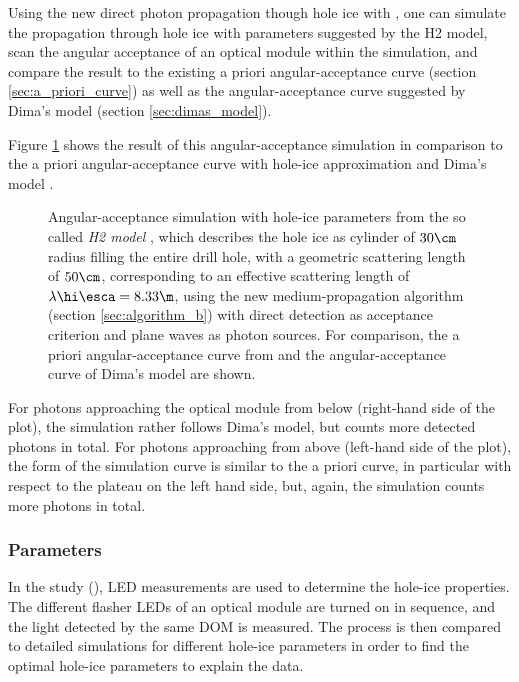Using the new direct photon propagation though hole ice with \clsim, one can simulate the propagation through hole ice with parameters suggested by the H2 model, scan the angular acceptance of an optical module within the simulation, and compare the result to the existing a priori angular-acceptance curve (section \ref{sec:a_priori_curve}) as well as the angular-acceptance curve suggested by Dima's model (section \ref{sec:dimas_model}).


Figure \ref{fig:xaeg2Mee} shows the result of this angular-acceptance simulation in comparison to the a priori angular-acceptance curve with hole-ice approximation \cite{icepaper} and Dima's model \cite{flasherdataderivedicemodels}.

\begin{figure}[htbp]
  \caption{Angular-acceptance simulation with hole-ice parameters from the so called \textit{H2 model} \cite{holeicestudieswithyag}, which describes the hole ice as cylinder of $30\cm$ radius filling the entire drill hole, with a geometric scattering length of $50\cm$, corresponding to an effective scattering length of $\lambda\hi\esca = 8.33\m$, using the new medium-propagation algorithm (section \ref{sec:algorithm_b}) with direct detection as acceptance criterion and plane waves as photon sources. For comparison, the a priori angular-acceptance curve from \cite{icepaper} and the angular-acceptance curve of Dima's model \cite{flasherdataderivedicemodels} are shown.}
  \label{fig:xaeg2Mee}
\end{figure}

For photons approaching the optical module from below (right-hand side of the plot), the simulation rather follows Dima's model, but counts more detected photons in total. For photons approaching from above (left-hand side of the plot), the form of the simulation curve is similar to the a priori curve, in particular with respect to the plateau on the left hand side, but, again, the simulation counts more photons in total.


\subsubsection{ Parameters}
\label{sec:dard_parameters}

In the  study (), LED measurements are used to determine the hole-ice properties. The different flasher LEDs of an optical module are turned on in sequence, and the light detected by the same DOM is measured. The process is then compared to detailed  simulations for different hole-ice parameters in order to find the optimal hole-ice parameters to explain the data. \cite{martindardupdate, martinspicehddard}

